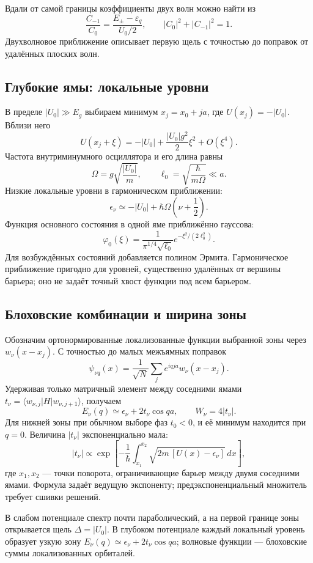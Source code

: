 \documentclass[../final.tex]{subfiles}
\begin{document}
Вдали от самой границы коэффициенты двух волн можно найти из
\[
    \frac{C_{-1}}{C_0}
       =\frac{E_\pm-\varepsilon_q}{U_0/2},\qquad
    |C_0|^2+|C_{-1}|^2=1.
\]
Двухволновое приближение описывает первую щель с точностью
до поправок от удалённых плоских волн.

\subsection*{Глубокие ямы: локальные уровни}

В пределе $|U_0|\gg E_g$ выбираем минимум $x_j=x_0+ja$,
где $U(x_j)=-|U_0|$. Вблизи него
\[
    U(x_j+\xi)=-|U_0|+\frac{|U_0|g^2}{2}\xi^2+O(\xi^4).
\]
Частота внутриминумного осциллятора и его длина равны
\[
    \Omega=g\sqrt{\frac{|U_0|}{m}},\qquad
    \ell_0=\sqrt{\frac{\hbar}{m\Omega}}\ll a.
\]
Низкие локальные уровни в гармоническом приближении:
\[
    \epsilon_\nu\simeq-|U_0|+\hbar\Omega\left(\nu+\frac12\right).
\]
Функция основного состояния в одной яме приближённо гауссова:
\[
    \varphi_0(\xi)=\frac1{\pi^{1/4}\sqrt{\ell_0}}
       e^{-\xi^2/(2\ell_0^2)}.
\]
Для возбуждённых состояний добавляется полином Эрмита.
Гармоническое приближение пригодно для уровней, существенно
удалённых от вершины барьера; оно не задаёт точный хвост функции
под всем барьером.

\subsection*{Блоховские комбинации и ширина зоны}

Обозначим ортонормированные локализованные функции выбранной зоны
через $w_\nu(x-x_j)$. С точностью до малых межъямных поправок
\[
    \psi_{\nu q}(x)=\frac1{\sqrt N}\sum_j
       e^{iqja}w_\nu(x-x_j).
\]
Удерживая только матричный элемент между соседними ямами
$t_\nu=\langle w_{\nu,j}|H|w_{\nu,j+1}\rangle$, получаем
\[
    E_\nu(q)\simeq\epsilon_\nu+2t_\nu\cos qa,
    \qquad W_\nu=4|t_\nu|.
\]
Для нижней зоны при обычном выборе фаз $t_0<0$, и её минимум
находится при $q=0$. Величина $|t_\nu|$ экспоненциально мала:
\[
    |t_\nu|\propto
       \exp\left[-\frac1\hbar\int_{x_1}^{x_2}
          \sqrt{2m\,[U(x)-\epsilon_\nu]}\,dx\right],
\]
где $x_1,x_2$ --- точки поворота, ограничивающие барьер
между двумя соседними ямами. Формула задаёт ведущую экспоненту;
предэкспоненциальный множитель требует сшивки решений.

\answer
В слабом потенциале спектр почти параболический, а на первой
границе зоны открывается щель $\Delta=|U_0|$.
В глубоком потенциале каждый локальный уровень образует узкую зону
$E_\nu(q)\simeq\epsilon_\nu+2t_\nu\cos qa$;
волновые функции --- блоховские суммы локализованных орбиталей.
\end{document}
